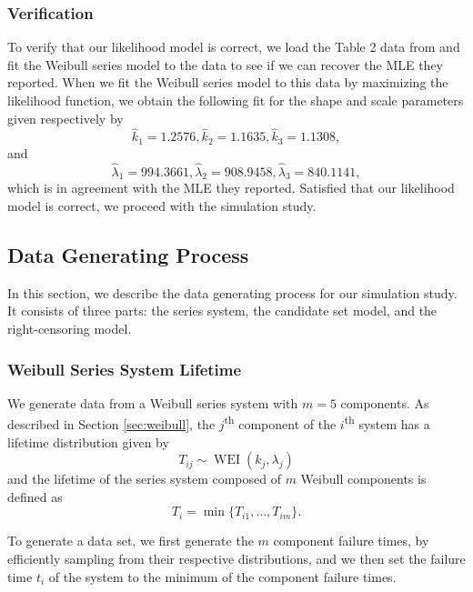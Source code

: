 \documentclass[
]{article}
\begin{document}
\hypertarget{verification}{%
\subsubsection*{Verification}\label{verification}}

To verify that our likelihood model is correct, we load the Table 2 data
from \citep{Huairu-2013} and fit the Weibull series model to the data to
see if we can recover the MLE they reported. When we fit the Weibull
series model to this data by maximizing the likelihood function, we
obtain the following fit for the shape and scale parameters given
respectively by \[
    \hat{k}_1 = 1.2576,
    \hat{k}_2 = 1.1635,
    \hat{k}_3 = 1.1308,
\] and \[
    \hat{\lambda}_1 = 994.3661,
    \hat{\lambda}_2 = 908.9458,
    \hat{\lambda}_3 = 840.1141,
\] which is in agreement with the MLE they reported. Satisfied that our
likelihood model is correct, we proceed with the simulation study.

\hypertarget{data-generating-process}{%
\subsection{Data Generating Process}\label{data-generating-process}}

In this section, we describe the data generating process for our
simulation study. It consists of three parts: the series system, the
candidate set model, and the right-censoring model.

\hypertarget{weibull-series-system-lifetime}{%
\subsubsection*{Weibull Series System
Lifetime}\label{weibull-series-system-lifetime}}

We generate data from a Weibull series system with \(m=5\) components.
As described in Section \ref{sec:weibull}, the \(j\)\textsuperscript{th}
component of the \(i\)\textsuperscript{th} system has a lifetime
distribution given by \[
    T_{i j} \sim \operatorname{WEI}(k_j, \lambda_j)
\] and the lifetime of the series system composed of \(m\) Weibull
components is defined as \[
    T_i = \min\{T_{i 1}, \ldots, T_{i m}\}.
\]

To generate a data set, we first generate the \(m\) component failure
times, by efficiently sampling from their respective distributions, and
we then set the failure time \(t_i\) of the system to the minimum of the
component failure times.
\end{document}
